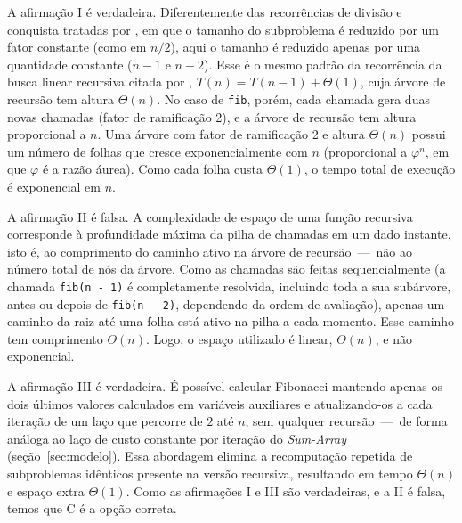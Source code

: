 \documentclass[12pt,a4paper]{article}
\begin{document}
A afirmação I é verdadeira.
Diferentemente das recorrências de divisão e conquista tratadas por \textcite[cap.~4]{clrs2022},
em que o tamanho do subproblema é reduzido por um fator constante (como em $n/2$),
aqui o tamanho é reduzido apenas por uma quantidade constante ($n-1$ e $n-2$).
Esse é o mesmo padrão da recorrência da busca linear recursiva citada por \textcite[cap.~4]{clrs2022},
$T(n) = T(n-1) + \Theta(1)$, cuja árvore de recursão tem altura $\Theta(n)$.
No caso de \texttt{fib}, porém, cada chamada gera duas novas chamadas (fator de ramificação 2),
e a árvore de recursão tem altura proporcional a $n$.
Uma árvore com fator de ramificação 2 e altura $\Theta(n)$ possui um número de folhas que cresce exponencialmente
com $n$ (proporcional a $\varphi^n$, em que $\varphi$ é a razão áurea).
Como cada folha custa $\Theta(1)$, o tempo total de execução é exponencial em $n$.

A afirmação II é falsa.
A complexidade de espaço de uma função recursiva corresponde à profundidade máxima da pilha de chamadas
em um dado instante, isto é, ao comprimento do caminho ativo na árvore de recursão~---~não ao número total de nós da árvore.
Como as chamadas são feitas sequencialmente
(a chamada \texttt{fib(n - 1)} é completamente resolvida, incluindo toda a sua subárvore,
antes ou depois de \texttt{fib(n - 2)}, dependendo da ordem de avaliação),
apenas um caminho da raiz até uma folha está ativo na pilha a cada momento.
Esse caminho tem comprimento $\Theta(n)$.
Logo, o espaço utilizado é linear, $\Theta(n)$, e não exponencial.

A afirmação III é verdadeira.
É possível calcular Fibonacci mantendo apenas os dois últimos valores calculados em variáveis auxiliares
e atualizando-os a cada iteração de um laço que percorre de $2$ até $n$, sem qualquer recursão~---~de forma análoga
ao laço de custo constante por iteração do \textit{Sum-Array} (seção~\ref{sec:modelo}).
Essa abordagem elimina a recomputação repetida de subproblemas idênticos presente na versão recursiva,
resultando em tempo $\Theta(n)$ e espaço extra $\Theta(1)$.
Como as afirmações I e III são verdadeiras, e a II é falsa, temos que C é a opção correta.
\newpage
\end{document}
